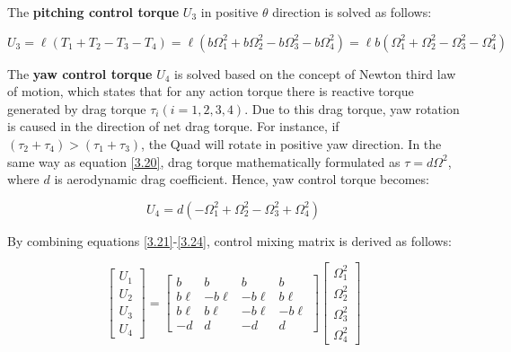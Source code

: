 \begin{small}
The \textbf{pitching control torque} $U_3$ in positive $\theta$ direction is solved as follows:

\begin{equation}
U_3 = \ell (T_1 + T_2 - T_3 - T_4) 
    = \ell (b\Omega_1^2 + b\Omega_2^2 - b\Omega_3^2 - b\Omega_4^2) = \ell b(\Omega_1^2 + \Omega_2^2 - \Omega_3^2 - \Omega_4^2)
\label{3.23}
\end{equation}



The \textbf{yaw control torque} $U_4$ is solved based on the concept of Newton third law of motion, 
which states that for any action torque there is reactive torque generated by drag torque $\tau_i (i=1,2,3,4)$. 
Due to this drag torque, yaw rotation is caused in the direction of net drag torque. 
For instance, if $(\tau_2 + \tau_4) > (\tau_1 + \tau_3)$, the Quad will rotate in positive yaw direction. 
In the same way as equation \eqref{3.20}, drag torque mathematically formulated as $\tau = d\Omega^2$, 
where $d$ is aerodynamic drag coefficient. Hence, yaw control torque becomes:

\begin{equation}
U_4 = d(-\Omega_1^2 + \Omega_2^2 - \Omega_3^2 + \Omega_4^2)
\label{3.24}
\end{equation}

By combining equations \eqref{3.21}-\eqref{3.24}, control mixing matrix is derived as follows:

\begin{equation}
\begin{bmatrix}
U_1 \\[6pt]
U_2 \\[6pt]
U_3 \\[6pt]
U_4
\end{bmatrix}
=
\begin{bmatrix}
b   & b   & b   & b   \\[6pt]
b\ell & -b\ell & -b\ell & b\ell \\[6pt]
b\ell & b\ell & -b\ell & -b\ell \\[6pt]
-d  & d   & -d  & d
\end{bmatrix}
\begin{bmatrix}
\Omega_1^2 \\[6pt]
\Omega_2^2 \\[6pt]
\Omega_3^2 \\[6pt]
\Omega_4^2
\end{bmatrix}    
\end{equation}


\end{small}
